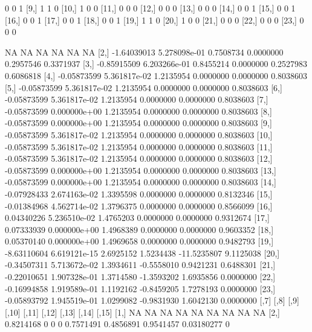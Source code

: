 \documentclass[a4paper]{article}
\begin{document}
\begin{Schunk}
\begin{Soutput}
 [8,]     0     0     1
 [9,]     1     1     0
[10,]     1     0     0
[11,]     0     0     0
[12,]     0     0     0
[13,]     0     0     0
[14,]     0     0     1
[15,]     0     0     1
[16,]     0     0     1
[17,]     0     0     1
[18,]     0     0     1
[19,]     1     1     0
[20,]     1     0     0
[21,]     0     0     0
[22,]     0     0     0
[23,]     0     0     0
\end{Soutput}
\begin{Soutput}
             [,1]         [,2]      [,3]       [,4]        [,5]      [,6]
 [1,]          NA           NA        NA         NA          NA        NA
 [2,] -1.64039013 5.278098e-01 0.7508734  0.0000000   0.2957546 0.3371937
 [3,] -0.85915509 6.203266e-01 0.8455214  0.0000000   0.2527983 0.6086818
 [4,] -0.05873599 5.361817e-02 1.2135954  0.0000000   0.0000000 0.8038603
 [5,] -0.05873599 5.361817e-02 1.2135954  0.0000000   0.0000000 0.8038603
 [6,] -0.05873599 5.361817e-02 1.2135954  0.0000000   0.0000000 0.8038603
 [7,] -0.05873599 0.000000e+00 1.2135954  0.0000000   0.0000000 0.8038603
 [8,] -0.05873599 0.000000e+00 1.2135954  0.0000000   0.0000000 0.8038603
 [9,] -0.05873599 5.361817e-02 1.2135954  0.0000000   0.0000000 0.8038603
[10,] -0.05873599 5.361817e-02 1.2135954  0.0000000   0.0000000 0.8038603
[11,] -0.05873599 5.361817e-02 1.2135954  0.0000000   0.0000000 0.8038603
[12,] -0.05873599 0.000000e+00 1.2135954  0.0000000   0.0000000 0.8038603
[13,] -0.05873599 0.000000e+00 1.2135954  0.0000000   0.0000000 0.8038603
[14,] -0.07928433 2.674163e-02 1.3395598  0.0000000   0.0000000 0.8132346
[15,] -0.01384968 4.562714e-02 1.3796375  0.0000000   0.0000000 0.8566099
[16,]  0.04340226 5.236510e-02 1.4765203  0.0000000   0.0000000 0.9312674
[17,]  0.07333939 0.000000e+00 1.4968389  0.0000000   0.0000000 0.9603352
[18,]  0.05370140 0.000000e+00 1.4969658  0.0000000   0.0000000 0.9482793
[19,] -8.63110604 6.619121e-15 2.6925152  1.5234438 -11.5235807 9.1125038
[20,] -0.34507311 5.713672e-02 1.3934611 -0.5558010   0.9421231 0.6488301
[21,] -0.22010651 1.907328e-01 1.3714580 -1.3593202   1.6935856 0.0000000
[22,] -0.16994858 1.919589e-01 1.1192162 -0.8459205   1.7278193 0.0000000
[23,] -0.05893792 1.945519e-01 1.0299082 -0.9831930   1.6042130 0.0000000
           [,7] [,8] [,9] [,10]     [,11]     [,12]      [,13]      [,14] [,15]
 [1,]        NA   NA   NA    NA        NA        NA         NA         NA    NA
 [2,] 0.8214168    0    0     0 0.7571491 0.4856891  0.9541457 0.03180277     0

\end{Soutput}
\end{Schunk}
\end{document}
